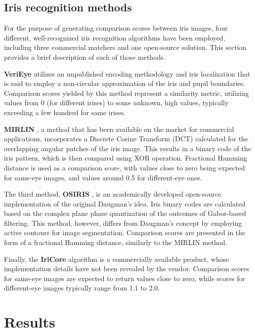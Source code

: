 \documentclass[10pt,twocolumn,letterpaper]{article}
\begin{document}
\subsection{Iris recognition methods}
For the purpose of generating comparison scores between iris images, four different, well-recognized iris recognition algorithms have been employed, including three commercial matchers and one open-source solution. This section provides a brief description of each of those methods. 

\textbf{VeriEye} \cite{VeriEye} utilizes an unpublished encoding methodology and iris localization that is said to employ a non-circular approximation of the iris and pupil boundaries. Comparison scores yielded by this method represent a similarity metric, utilizing values from 0 (for different irises) to some unknown, high values, typically exceeding a few hundred for same irises.

\textbf{MIRLIN} \cite{Monro2007}\cite{MIRLIN}, a method that has been available on the market for commercial applications, incorporates a Discrete Cosine Transform (DCT) calculated for the overlapping angular patches of the iris image. This results in a binary code of the iris pattern, which is then compared using XOR operation. Fractional Hamming distance is used as a comparison score, with values close to zero being expected for same-eye images, and values around 0.5 for different-eye ones. 

The third method, \textbf{OSIRIS} \cite{OSIRIS}, is an academically developed open-source implementation of the original Daugman's idea. Iris binary codes are calculated based on the complex plane phase quantization of the outcomes of Gabor-based filtering. This method, however, differs from Daugman's concept by employing active contours for image segmentation. Comparison scores are presented in the form of a fractional Hamming distance, similarly to the MIRLIN method. 

Finally, the \textbf{IriCore} \cite{IriCore} algorithm is a commercially available product, whose implementation details have not been revealed by the vendor. Comparison scores for same-eye images are expected to return values close to zero, while scores for different-eye images typically range from 1.1 to 2.0.  


\section{Results}
\label{sec:Results}
\end{document}

